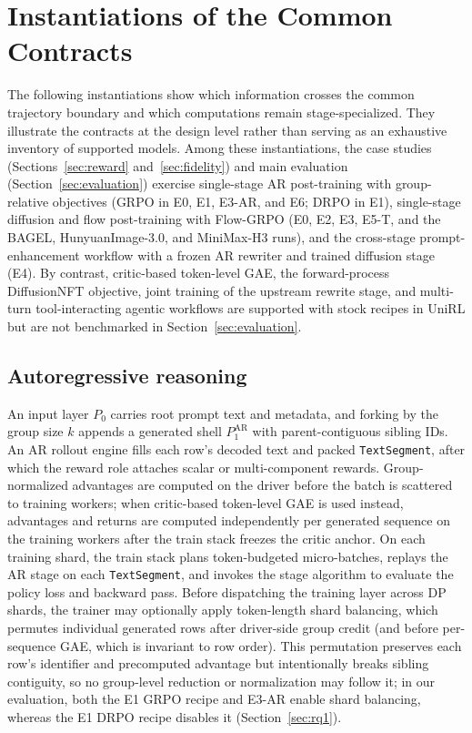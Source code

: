 \documentclass[10pt]{article}
\begin{document}
\section{Instantiations of the Common Contracts}
\label{sec:instantiations}

The following instantiations show which information crosses the common trajectory boundary and which computations remain stage-specialized.
They illustrate the contracts at the design level rather than serving as an exhaustive inventory of supported models.
Among these instantiations, the case studies (Sections~\ref{sec:reward} and~\ref{sec:fidelity}) and main evaluation (Section~\ref{sec:evaluation}) exercise single-stage AR post-training with group-relative objectives (GRPO in E0, E1, E3-AR, and E6; DRPO in E1), single-stage diffusion and flow post-training with Flow-GRPO (E0, E2, E3, E5-T, and the BAGEL, HunyuanImage-3.0, and MiniMax-H3 runs), and the cross-stage prompt-enhancement workflow with a frozen AR rewriter and trained diffusion stage (E4).
By contrast, critic-based token-level GAE, the forward-process DiffusionNFT objective, joint training of the upstream rewrite stage, and multi-turn tool-interacting agentic workflows are supported with stock recipes in UniRL but are not benchmarked in Section~\ref{sec:evaluation}.

\subsection{Autoregressive reasoning}

An input layer $P_0$ carries root prompt text and metadata, and forking by the group size $k$ appends a generated shell $P_1^{\mathrm{AR}}$ with parent-contiguous sibling IDs.
An AR rollout engine fills each row's decoded text and packed \texttt{TextSegment}, after which the reward role attaches scalar or multi-component rewards.
Group-normalized advantages are computed on the driver before the batch is scattered to training workers; when critic-based token-level GAE is used instead, advantages and returns are computed independently per generated sequence on the training workers after the train stack freezes the critic anchor.
On each training shard, the train stack plans token-budgeted micro-batches, replays the AR stage on each \texttt{TextSegment}, and invokes the stage algorithm to evaluate the policy loss and backward pass.
Before dispatching the training layer across DP shards, the trainer may optionally apply token-length shard balancing, which permutes individual generated rows after driver-side group credit (and before per-sequence GAE, which is invariant to row order).
This permutation preserves each row's identifier and precomputed advantage but intentionally breaks sibling contiguity, so no group-level reduction or normalization may follow it; in our evaluation, both the E1 GRPO recipe and E3-AR enable shard balancing, whereas the E1 DRPO recipe disables it (Section~\ref{sec:rq1}).
\end{document}
